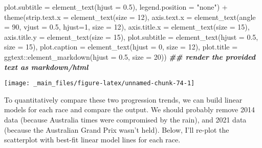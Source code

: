 \documentclass[
]{book}
\newenvironment{Shaded}{\begin{snugshade}}{\end{snugshade}}
\newcommand{\AttributeTok}[1]{\textcolor[rgb]{0.77,0.63,0.00}{#1}}
\newcommand{\DecValTok}[1]{\textcolor[rgb]{0.00,0.00,0.81}{#1}}
\newcommand{\DocumentationTok}[1]{\textcolor[rgb]{0.56,0.35,0.01}{\textbf{\textit{#1}}}}
\newcommand{\FloatTok}[1]{\textcolor[rgb]{0.00,0.00,0.81}{#1}}
\newcommand{\FunctionTok}[1]{\textcolor[rgb]{0.00,0.00,0.00}{#1}}
\newcommand{\NormalTok}[1]{#1}
\newcommand{\SpecialCharTok}[1]{\textcolor[rgb]{0.00,0.00,0.00}{#1}}
\newcommand{\StringTok}[1]{\textcolor[rgb]{0.31,0.60,0.02}{#1}}
\begin{document}
\begin{Shaded}
\begin{Highlighting}[]
        \AttributeTok{plot.subtitle =} \FunctionTok{element\_text}\NormalTok{(}\AttributeTok{hjust =} \FloatTok{0.5}\NormalTok{),}
        \AttributeTok{legend.position =} \StringTok{"none"}\NormalTok{) }\SpecialCharTok{+}
  \FunctionTok{theme}\NormalTok{(}\AttributeTok{strip.text.x =} \FunctionTok{element\_text}\NormalTok{(}\AttributeTok{size =} \DecValTok{12}\NormalTok{),}
        \AttributeTok{axis.text.x =} \FunctionTok{element\_text}\NormalTok{(}\AttributeTok{angle =} \DecValTok{90}\NormalTok{, }\AttributeTok{vjust =} \FloatTok{0.5}\NormalTok{, }\AttributeTok{hjust=}\DecValTok{1}\NormalTok{, }\AttributeTok{size =} \DecValTok{12}\NormalTok{),}
        \AttributeTok{axis.title.x =} \FunctionTok{element\_text}\NormalTok{(}\AttributeTok{size =} \DecValTok{15}\NormalTok{),}
        \AttributeTok{axis.title.y =} \FunctionTok{element\_text}\NormalTok{(}\AttributeTok{size =} \DecValTok{15}\NormalTok{),}
         \AttributeTok{plot.subtitle =} \FunctionTok{element\_text}\NormalTok{(}\AttributeTok{hjust =} \FloatTok{0.5}\NormalTok{, }\AttributeTok{size =} \DecValTok{15}\NormalTok{),}
         \AttributeTok{plot.caption =} \FunctionTok{element\_text}\NormalTok{(}\AttributeTok{hjust =} \DecValTok{0}\NormalTok{, }\AttributeTok{size =} \DecValTok{12}\NormalTok{),}
        \AttributeTok{plot.title =}\NormalTok{ ggtext}\SpecialCharTok{::}\FunctionTok{element\_markdown}\NormalTok{(}\AttributeTok{hjust =} \FloatTok{0.5}\NormalTok{, }\AttributeTok{size =} \DecValTok{20}\NormalTok{)) }\DocumentationTok{\#\# render the provided text as markdown/html}
\end{Highlighting}
\end{Shaded}

\begin{center}\texttt{[image: \_main\_files/figure-latex/unnamed-chunk-74-1]} \end{center}

To quantitatively compare these two progression trends, we can build linear models for each race and compare the output. We should probably remove 2014 data (because Australia times were compromised by the rain), and 2021 data (because the Australian Grand Prix wasn't held). Below, I'll re-plot the scatterplot with best-fit linear model lines for each race.
\end{document}
